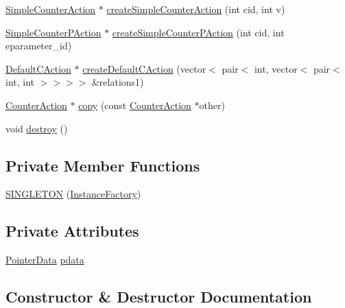 \begin{DoxyCompactItemize}
\item 
\mbox{\hyperlink{classgraphsat_1_1_simple_counter_action}{Simple\+Counter\+Action}} $\ast$ \mbox{\hyperlink{classgraphsat_1_1_instance_factory_a999723c91c8a562def330b2498f26fa8}{create\+Simple\+Counter\+Action}} (int cid, int v)
\item 
\mbox{\hyperlink{classgraphsat_1_1_simple_counter_p_action}{Simple\+Counter\+P\+Action}} $\ast$ \mbox{\hyperlink{classgraphsat_1_1_instance_factory_a1c7c11da85acdf5b5a1078a50b808f97}{create\+Simple\+Counter\+P\+Action}} (int cid, int eparameter\+\_\+id)
\item 
\mbox{\hyperlink{classgraphsat_1_1_default_c_action}{Default\+C\+Action}} $\ast$ \mbox{\hyperlink{classgraphsat_1_1_instance_factory_aa74280c3c94e38d1b092925172181276}{create\+Default\+C\+Action}} (vector$<$ pair$<$ int, vector$<$ pair$<$ int, int $>$$>$$>$$>$ \&relations1)
\item 
\mbox{\hyperlink{classgraphsat_1_1_counter_action}{Counter\+Action}} $\ast$ \mbox{\hyperlink{classgraphsat_1_1_instance_factory_ae9785cba22bec8be6e89dcc1bd207bd9}{copy}} (const \mbox{\hyperlink{classgraphsat_1_1_counter_action}{Counter\+Action}} $\ast$other)
\item 
void \mbox{\hyperlink{classgraphsat_1_1_instance_factory_afae2681997d939f16abcbc0fb53866bd}{destroy}} ()
\end{DoxyCompactItemize}
\subsection*{Private Member Functions}
\begin{DoxyCompactItemize}
\item 
\mbox{\hyperlink{classgraphsat_1_1_instance_factory_a821ef74add33f8bc36491344dbeab8ab}{S\+I\+N\+G\+L\+E\+T\+ON}} (\mbox{\hyperlink{classgraphsat_1_1_instance_factory}{Instance\+Factory}})
\end{DoxyCompactItemize}
\subsection*{Private Attributes}
\begin{DoxyCompactItemize}
\item 
\mbox{\hyperlink{namespacegraphsat_a107ef8404e59d9b9e5c375face044c42}{Pointer\+Data}} \mbox{\hyperlink{classgraphsat_1_1_instance_factory_a869120dc983d8c65a57e64176f4aa752}{pdata}}
\end{DoxyCompactItemize}


\subsection{Constructor \& Destructor Documentation}
\mbox{\label{classgraphsat_1_1_instance_factory_a2a267949518b2bd1a09090757fe46a79}} 
